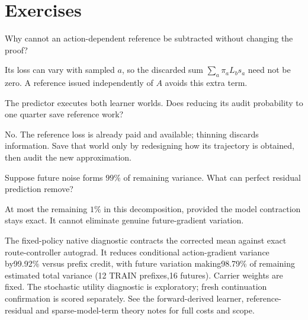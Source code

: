 \documentclass[11pt]{article}
\begin{document}
\section*{Exercises}
\begin{exercise}Why cannot an action-dependent reference be subtracted without changing the proof?\end{exercise}
\begin{solution}Its loss can vary with sampled $a$, so the discarded sum $\sum_a\pi_a L_b s_a$ need not be zero. A reference issued independently of $A$ avoids this extra term.\end{solution}
\begin{exercise}The predictor executes both learner worlds. Does reducing its audit probability to one quarter save reference work?\end{exercise}
\begin{solution}No. The reference loss is already paid and available; thinning discards information. Save that world only by redesigning how its trajectory is obtained, then audit the new approximation.\end{solution}
\begin{exercise}Suppose future noise forms $99\%$ of remaining variance. What can perfect residual prediction remove?\end{exercise}
\begin{solution}At most the remaining $1\%$ in this decomposition, provided the model contraction stays exact. It cannot eliminate genuine future-gradient variation.\end{solution}
\begin{inourmodels}
The fixed-policy native diagnostic contracts the corrected mean against exact route-controller autograd. It reduces conditional action-gradient variance by99.92\% versus prefix credit, with future variation making98.79\% of remaining estimated total variance (12 TRAIN prefixes,16 futures). Carrier weights are fixed. The stochastic utility diagnostic is exploratory; fresh continuation confirmation is scored separately. See the forward-derived learner, reference-residual and sparse-model-term theory notes for full costs and scope.
\end{inourmodels}
\end{document}
